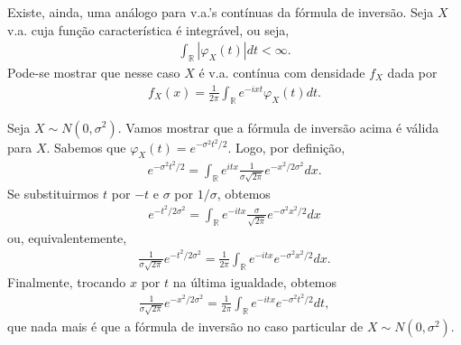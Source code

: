 \documentclass[../Notas.tex]{subfiles}
\begin{document}
Existe, ainda, uma análogo para v.a.'s contínuas da fórmula de inversão. Seja $X$ v.a. cuja função característica é integrável, ou seja,
\begin{align*}
    \int_{\mathbb{R}} |\varphi_X(t)| dt < \infty.
\end{align*}
Pode-se mostrar que nesse caso $X$ é v.a. contínua com densidade $f_X$ dada por
\begin{align*}
    f_X(x) = \frac{1}{2\pi}\int_{\mathbb{R}} e^{-ixt}\varphi_X(t) dt.
\end{align*}

\begin{example}
    Seja $X\sim N(0, \sigma^2)$. Vamos mostrar que a fórmula de inversão acima é válida para $X$. Sabemos que $\varphi_X(t) = e^{-\sigma^2t^2/2}$. Logo, por definição,
    \begin{align*}
        e^{-\sigma^2t^2/2} = \int_{\mathbb{R}} e^{itx}\frac{1}{\sigma\sqrt{2\pi}}e^{-x^2/2\sigma^2} dx.
    \end{align*}
    Se substituirmos $t$ por $-t$ e $\sigma$ por $1/\sigma$, obtemos
    \begin{align*}
        e^{-t^2/2\sigma^2} = \int_{\mathbb{R}} e^{-itx}\frac{\sigma}{\sqrt{2\pi}}e^{-\sigma^2x^2/2} dx
    \end{align*}
    ou, equivalentemente,
    \begin{align*}
        \frac{1}{\sigma\sqrt{2\pi}}e^{-t^2/2\sigma^2} = \frac{1}{2\pi}\int_{\mathbb{R}} e^{-itx}e^{-\sigma^2x^2/2} dx.
    \end{align*}
    Finalmente, trocando $x$ por $t$ na última igualdade, obtemos
    \begin{align*}
        \frac{1}{\sigma\sqrt{2\pi}}e^{-x^2/2\sigma^2} = \frac{1}{2\pi}\int_{\mathbb{R}} e^{-itx}e^{-\sigma^2t^2/2} dt,
    \end{align*}
    que nada mais é que a fórmula de inversão no caso particular de $X\sim N(0, \sigma^2)$.
\end{example}
\end{document}
